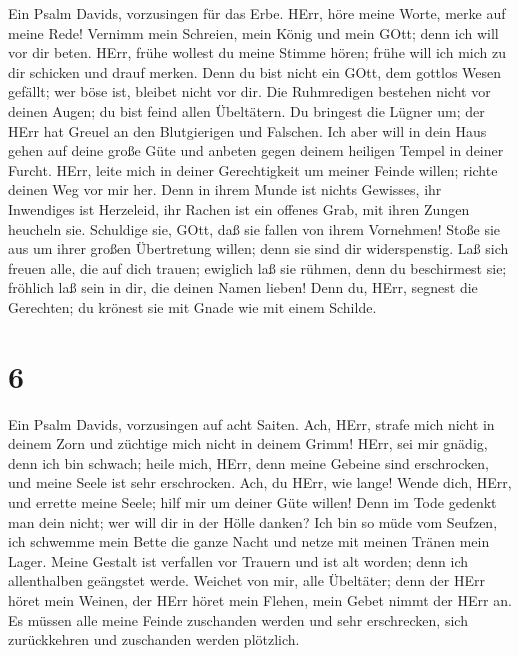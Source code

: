  Ein Psalm Davids, vorzusingen für das Erbe. 
HErr, höre meine Worte, merke auf meine Rede!  Vernimm mein
Schreien, mein König und mein GOtt; denn ich will vor dir beten.
 HErr, frühe wollest du meine Stimme hören; frühe will ich
mich zu dir schicken und drauf merken.  Denn du bist nicht
ein GOtt, dem gottlos Wesen gefällt; wer böse ist, bleibet nicht vor
dir.  Die Ruhmredigen bestehen nicht vor deinen Augen; du
bist feind allen Übeltätern.  Du bringest die Lügner um; der
HErr hat Greuel an den Blutgierigen und Falschen.  Ich aber
will in dein Haus gehen auf deine große Güte und anbeten gegen deinem
heiligen Tempel in deiner Furcht.  HErr, leite mich in
deiner Gerechtigkeit um meiner Feinde willen; richte deinen Weg vor mir
her.  Denn in ihrem Munde ist nichts Gewisses, ihr
Inwendiges ist Herzeleid, ihr Rachen ist ein offenes Grab, mit ihren
Zungen heucheln sie.  Schuldige sie, GOtt, daß sie fallen
von ihrem Vornehmen! Stoße sie aus um ihrer großen Übertretung willen;
denn sie sind dir widerspenstig.  Laß sich freuen alle, die
auf dich trauen; ewiglich laß sie rühmen, denn du beschirmest sie;
fröhlich laß sein in dir, die deinen Namen lieben!  Denn
du, HErr, segnest die Gerechten; du krönest sie mit Gnade wie mit einem
Schilde.

\hypertarget{section-5}{%
\section{6}\label{section-5}}

 Ein Psalm Davids, vorzusingen auf acht Saiten. 
Ach, HErr, strafe mich nicht in deinem Zorn und züchtige mich nicht in
deinem Grimm!  HErr, sei mir gnädig, denn ich bin schwach;
heile mich, HErr, denn meine Gebeine sind erschrocken,  und
meine Seele ist sehr erschrocken. Ach, du HErr, wie lange! 
Wende dich, HErr, und errette meine Seele; hilf mir um deiner Güte
willen!  Denn im Tode gedenkt man dein nicht; wer will dir
in der Hölle danken?  Ich bin so müde vom Seufzen, ich
schwemme mein Bette die ganze Nacht und netze mit meinen Tränen mein
Lager.  Meine Gestalt ist verfallen vor Trauern und ist alt
worden; denn ich allenthalben geängstet werde.  Weichet von
mir, alle Übeltäter; denn der HErr höret mein Weinen,  der
HErr höret mein Flehen, mein Gebet nimmt der HErr an.  Es
müssen alle meine Feinde zuschanden werden und sehr erschrecken, sich
zurückkehren und zuschanden werden plötzlich.

